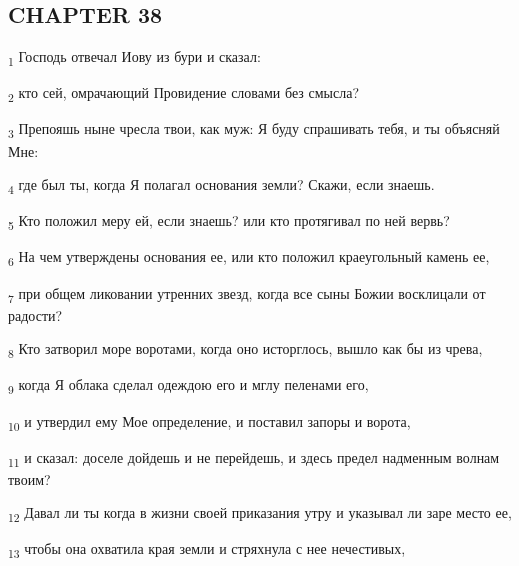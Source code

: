 \subsection{CHAPTER 38}
\begin{tcolorbox}
\textsubscript{1} Господь отвечал Иову из бури и сказал:
\end{tcolorbox}
\begin{tcolorbox}
\textsubscript{2} кто сей, омрачающий Провидение словами без смысла?
\end{tcolorbox}
\begin{tcolorbox}
\textsubscript{3} Препояшь ныне чресла твои, как муж: Я буду спрашивать тебя, и ты объясняй Мне:
\end{tcolorbox}
\begin{tcolorbox}
\textsubscript{4} где был ты, когда Я полагал основания земли? Скажи, если знаешь.
\end{tcolorbox}
\begin{tcolorbox}
\textsubscript{5} Кто положил меру ей, если знаешь? или кто протягивал по ней вервь?
\end{tcolorbox}
\begin{tcolorbox}
\textsubscript{6} На чем утверждены основания ее, или кто положил краеугольный камень ее,
\end{tcolorbox}
\begin{tcolorbox}
\textsubscript{7} при общем ликовании утренних звезд, когда все сыны Божии восклицали от радости?
\end{tcolorbox}
\begin{tcolorbox}
\textsubscript{8} Кто затворил море воротами, когда оно исторглось, вышло как бы из чрева,
\end{tcolorbox}
\begin{tcolorbox}
\textsubscript{9} когда Я облака сделал одеждою его и мглу пеленами его,
\end{tcolorbox}
\begin{tcolorbox}
\textsubscript{10} и утвердил ему Мое определение, и поставил запоры и ворота,
\end{tcolorbox}
\begin{tcolorbox}
\textsubscript{11} и сказал: доселе дойдешь и не перейдешь, и здесь предел надменным волнам твоим?
\end{tcolorbox}
\begin{tcolorbox}
\textsubscript{12} Давал ли ты когда в жизни своей приказания утру и указывал ли заре место ее,
\end{tcolorbox}
\begin{tcolorbox}
\textsubscript{13} чтобы она охватила края земли и стряхнула с нее нечестивых,
\end{tcolorbox}
